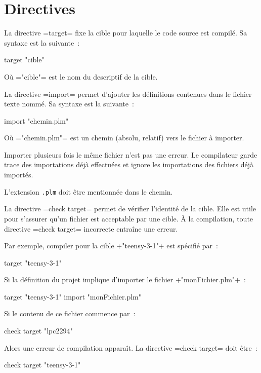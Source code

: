 




\chapter{Directives}



La directive \plm=target= fixe la cible pour laquelle le code source est compilé. Sa syntaxe est la suivante~:
\begin{PLM}
target "cible"
\end{PLM} 
Où \plm="cible"= est le nom du descriptif de la cible.







La directive \plm=import= permet d'ajouter les définitions contenues dans le fichier texte nommé. Sa syntaxe est la suivante~:
\begin{PLM}
import "chemin.plm"
\end{PLM} 
Où \plm="chemin.plm"= est un chemin (absolu, relatif) vers le fichier à importer.

Importer plusieurs fois le même fichier n'est pas une erreur. Le compilateur garde trace des importations déjà effectuées et ignore les importations des fichiers déjà importés.

L'extension \texttt{.plm} doit être mentionnée dans le chemin.



La directive \plm=check target= permet de vérifier l'identité de la cible. Elle est utile pour s'assurer qu'un fichier est acceptable par une cible. À la compilation, toute directive \plm=check target= incorrecte entraîne une erreur.

Par exemple, compiler pour la cible \plm+"teensy-3-1"+ est spécifié par~:

\begin{PLM}
target "teensy-3-1"
\end{PLM}

Si la définition du projet implique d'importer le fichier \plm+"monFichier.plm"+~:

\begin{PLM}
target "teensy-3-1"
import "monFichier.plm"
\end{PLM}

Si le contenu de ce fichier commence par~:
\begin{PLM}
check target "lpc2294"
\end{PLM}

Alors une erreur de compilation apparaît. La directive \plm=check target= doit être~:
\begin{PLM}
check target "teensy-3-1"
\end{PLM}

